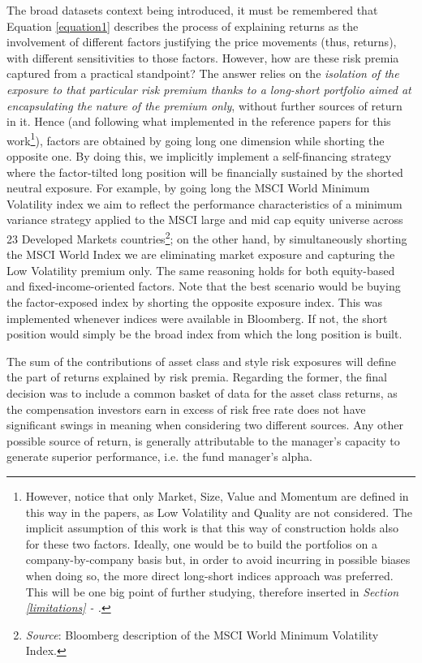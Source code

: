 \documentclass[12pt]{article}
\begin{document}
The broad datasets context being introduced, it must be remembered that Equation \ref{equation1} describes the process of explaining returns as the involvement of different factors justifying the price movements (thus, returns), with different sensitivities to those factors. However, how are these risk premia captured from a practical standpoint? The answer relies on the \textit{isolation of the exposure to that particular risk premium thanks to a long-short portfolio aimed at encapsulating the nature of the premium only}, without further sources of return in it. Hence (and following what implemented in the reference papers for this work\footnote{However, notice that only Market, Size, Value and Momentum are defined in this way in the papers, as Low Volatility and Quality are not considered. The implicit assumption of this work is that this way of construction holds also for these two factors. Ideally, one would be to build the portfolios on a company-by-company basis but, in order to avoid incurring in possible biases when doing so, the more direct long-short indices approach was preferred. This will be one big point of further studying, therefore inserted in \textit{Section \ref{limitations} - .}}), factors are obtained by going long one dimension while shorting the opposite one. By doing this, we implicitly implement a self-financing strategy where the factor-tilted long position will be financially sustained by the shorted neutral exposure. For example, by going long the MSCI World Minimum Volatility index we aim to reflect the performance characteristics of a minimum variance strategy applied to the MSCI large and mid cap equity universe across 23 Developed Markets countries\footnote{\textit{Source}: Bloomberg description of the MSCI World Minimum Volatility Index.}; on the other hand, by simultaneously shorting the MSCI World Index we are eliminating market exposure and capturing the Low Volatility premium only. The same reasoning holds for both equity-based and fixed-income-oriented factors. Note that the best scenario would be buying the factor-exposed index by shorting the opposite exposure index. This was implemented whenever indices were available in Bloomberg. If not, the short position would simply be the broad index from which the long position is built.

The sum of the contributions of asset class and style risk exposures will define the part of returns explained by risk premia. Regarding the former, the final decision was to include a common basket of data for the asset class returns, as the compensation investors earn in excess of risk free rate does not have significant swings in meaning when considering two different sources. Any other possible source of return, is generally attributable to the manager's capacity to generate superior performance, i.e. the fund manager's alpha.
\end{document}
